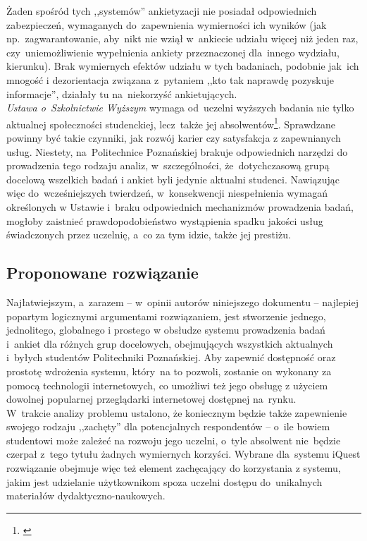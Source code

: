 Żaden spośród tych ,,systemów'' ankietyzacji nie posiadał odpowiednich zabezpieczeń, wymaganych do~zapewnienia wymierności ich wyników (jak np.~zagwarantowanie, aby~nikt nie wziął w~ankiecie udziału więcej niż jeden raz, czy~uniemożliwienie wypełnienia ankiety przeznaczonej dla~innego wydziału, kierunku). Brak wymiernych efektów udziału w tych badaniach, podobnie jak~ich mnogość i dezorientacja związana z~pytaniem ,,kto tak naprawdę pozyskuje informacje'', działały tu na~niekorzyść ankietujących. \\

\textit{Ustawa o~Szkolnictwie Wyższym} wymaga od~uczelni wyższych badania nie tylko aktualnej społeczności studenckiej, lecz~także jej absolwentów\footnote{\cite{AP:PoSW05}}. Sprawdzane powinny być takie czynniki, jak rozwój karier czy satysfakcja z zapewnianych usług. Niestety, na~Politechnice Poznańskiej brakuje odpowiednich narzędzi do prowadzenia tego rodzaju analiz, w~szczególności, że~dotychczasową grupą docelową wszelkich badań i ankiet byli jedynie aktualni studenci. Nawiązując więc do~wcześniejszych twierdzeń, w~konsekwencji niespełnienia wymagań określonych w Ustawie i~braku odpowiednich mechanizmów prowadzenia badań, mogłoby zaistnieć prawdopodobieństwo wystąpienia spadku jakości usług świadczonych przez uczelnię, a~co za tym idzie, także jej prestiżu.

\subsection{Proponowane rozwiązanie}
\label{Chapter112}

Najłatwiejszym, a~zarazem -- w~opinii autorów niniejszego dokumentu -- najlepiej popartym logicznymi argumentami rozwiązaniem, jest stworzenie jednego, jednolitego, globalnego i prostego w obsłudze systemu prowadzenia badań i~ankiet dla różnych grup docelowych, obejmujących wszystkich aktualnych i~byłych studentów Politechniki Poznańskiej. Aby zapewnić dostępność oraz prostotę wdrożenia systemu, który~na to pozwoli, zostanie on wykonany za pomocą technologii internetowych, co umożliwi też jego obsługę z użyciem dowolnej popularnej przeglądarki internetowej dostępnej na~rynku. \\

W~trakcie analizy problemu ustalono, że koniecznym będzie także zapewnienie swojego rodzaju ,,zachęty'' dla potencjalnych respondentów -- o~ile bowiem studentowi może zależeć na rozwoju jego uczelni, o~tyle absolwent nie~będzie czerpał z~tego tytułu żadnych wymiernych korzyści. Wybrane dla~systemu iQuest rozwiązanie obejmuje więc też element zachęcający do korzystania z systemu, jakim jest udzielanie użytkownikom spoza uczelni dostępu do~unikalnych materiałów dydaktyczno-naukowych. \\


